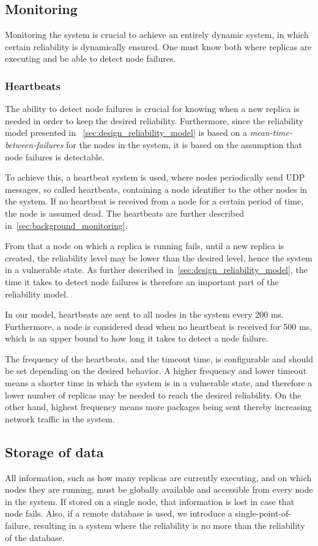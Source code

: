 \documentclass{cslthse-msc}
\begin{document}
\subsection{Monitoring} \label{subsec:design_monitoring}
Monitoring the system is crucial to achieve an entirely dynamic system, in which certain reliability is dynamically ensured. One must know both where replicas are executing and be able to detect node failures.

\subsubsection{Heartbeats}
The ability to detect node failures is crucial for knowing when a new replica is needed in order to keep the desired reliability. Furthermore, since the reliability model presented in ~\cref{sec:design_reliability_model} is based on a \emph{mean-time-between-failures} for the nodes in the system, it is based on the assumption that node failures is detectable. 

To achieve this, a heartbeat system is used, where nodes periodically send UDP messages, so called heartbeats, containing a node identifier to the other nodes in the system. If no heartbeat is received from a node for a certain period of time, the node is assumed dead. The heartbeats are further described in~\cref{sec:background_monitoring}.

From that a node on which a replica is running fails, until a new replica is created, the reliability level may be lower than the desired level, hence the system in a vulnerable state. As further described in~\cref{sec:design_reliability_model}, the time it takes to detect node failures is therefore an important part of the reliability model.

In our model, heartbeats are sent to all nodes in the system every 200 ms. Furthermore, a node is considered dead when no heartbeat is received for 500 ms, which is an upper bound to how long it takes to detect a node failure. 

The frequency of the heartbeats, and the timeout time, is configurable and should be set depending on the desired behavior. A higher frequency and lower timeout means a shorter time in which the system is in a vulnerable state, and therefore a lower number of replicas may be needed to reach the desired reliability. On the other hand, highest frequency means more packages being sent thereby increasing network traffic in the system.

\subsection{Storage of data} \label{subsec:design_storage}
All information, such as how many replicas are currently executing, and on which nodes they are running, must be globally available and accessible from every node in the system. If stored on a single node, that information is lost in case that node fails. Also, if a remote database is used, we introduce a single-point-of-failure, resulting in a system where the reliability is no more than the reliability of the database. 
\end{document}
